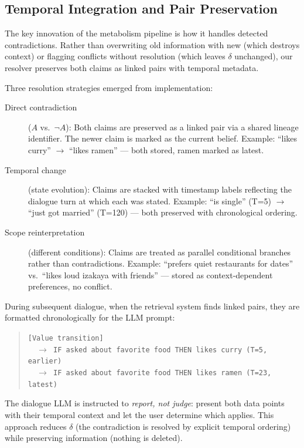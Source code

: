 \documentclass[11pt,a4paper]{article}
\begin{document}
\subsection{Temporal Integration and Pair Preservation}
\label{sec:resolution}

The key innovation of the metabolism pipeline is how it handles detected contradictions.
Rather than overwriting old information with new (which destroys context) or flagging conflicts without resolution (which leaves $\delta$ unchanged), our resolver preserves both claims as linked pairs with temporal metadata.

Three resolution strategies emerged from implementation:\label{sec:three-strategies}

\begin{description}\item[Direct contradiction] ($A$ vs.\ $\neg A$): Both claims are preserved as a linked pair via a shared lineage identifier. The newer claim is marked as the current belief. Example: ``likes curry'' $\to$ ``likes ramen'' --- both stored, ramen marked as latest.

\item[Temporal change] (state evolution): Claims are stacked with timestamp labels reflecting the dialogue turn at which each was stated. Example: ``is single'' (T=5) $\to$ ``just got married'' (T=120) --- both preserved with chronological ordering.

\item[Scope reinterpretation] (different conditions): Claims are treated as parallel conditional branches rather than contradictions. Example: ``prefers quiet restaurants for dates'' vs.\ ``likes loud izakaya with friends'' --- stored as context-dependent preferences, no conflict.
\end{description}

During subsequent dialogue, when the retrieval system finds linked pairs, they are formatted chronologically for the LLM prompt:

\begin{quote}
\small
\texttt{[Value transition]}\\
\texttt{~~$\to$ IF asked about favorite food THEN likes curry (T=5, earlier)}\\
\texttt{~~$\to$ IF asked about favorite food THEN likes ramen (T=23, latest)}
\end{quote}

The dialogue LLM is instructed to \emph{report, not judge}: present both data points with their temporal context and let the user determine which applies.
This approach reduces $\delta$ (the contradiction is resolved by explicit temporal ordering) while preserving information (nothing is deleted).
\end{document}
